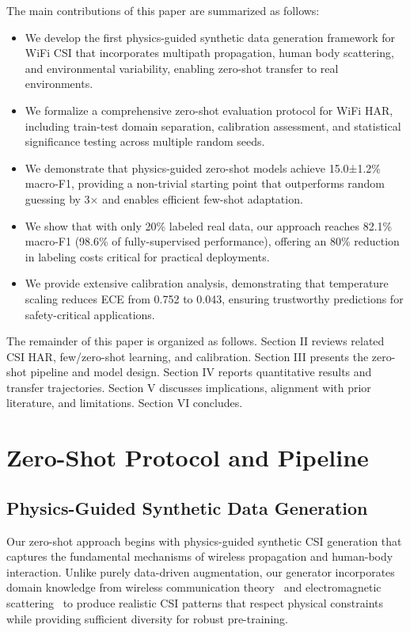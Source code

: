 \documentclass[journal]{IEEEtran}
\begin{document}
The main contributions of this paper are summarized as follows:
\begin{itemize}
  \item We develop the first physics-guided synthetic data generation framework for WiFi CSI that incorporates multipath propagation, human body scattering, and environmental variability, enabling zero-shot transfer to real environments.
  \item We formalize a comprehensive zero-shot evaluation protocol for WiFi HAR, including train-test domain separation, calibration assessment, and statistical significance testing across multiple random seeds.
  \item We demonstrate that physics-guided zero-shot models achieve 15.0±1.2\% macro-F1, providing a non-trivial starting point that outperforms random guessing by 3× and enables efficient few-shot adaptation.
  \item We show that with only 20\% labeled real data, our approach reaches 82.1\% macro-F1 (98.6\% of fully-supervised performance), offering an 80\% reduction in labeling costs critical for practical deployments.
  \item We provide extensive calibration analysis, demonstrating that temperature scaling reduces ECE from 0.752 to 0.043, ensuring trustworthy predictions for safety-critical applications.
\end{itemize}

The remainder of this paper is organized as follows. Section II reviews related CSI HAR, few/zero-shot learning, and calibration. Section III presents the zero-shot pipeline and model design. Section IV reports quantitative results and transfer trajectories. Section V discusses implications, alignment with prior literature, and limitations. Section VI concludes.

\section{Zero-Shot Protocol and Pipeline}

\subsection{Physics-Guided Synthetic Data Generation}
Our zero-shot approach begins with physics-guided synthetic CSI generation that captures the fundamental mechanisms of wireless propagation and human-body interaction. Unlike purely data-driven augmentation, our generator incorporates domain knowledge from wireless communication theory~\cite{goldsmith2005wireless} and electromagnetic scattering~\cite{mie1908beitrage} to produce realistic CSI patterns that respect physical constraints while providing sufficient diversity for robust pre-training.
\end{document}
